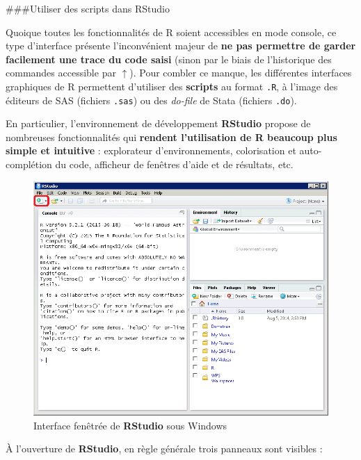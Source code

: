 \documentclass[12pt,twosided, notitlepage]{book}
\begin{document}
\#\#\#Utiliser des scripts dans RStudio

Quoique toutes les fonctionnalités de R soient accessibles en mode
console, ce type d'interface présente l'inconvénient majeur de
\textbf{ne pas permettre de garder facilement une trace du code saisi}
(sinon par le biais de l'historique des commandes accessible par
\(\uparrow\)). Pour combler ce manque, les différentes interfaces
graphiques de R permettent d'utiliser des \textbf{scripts} au format
\texttt{.R}, à l'image des éditeurs de SAS (fichiers \texttt{.sas}) ou
des \emph{do-file} de Stata (fichiers \texttt{.do}).

En particulier, l'environnement de développement \textbf{RStudio}
propose de nombreuses fonctionnalités qui \textbf{rendent l'utilisation
de R beaucoup plus simple et intuitive} : explorateur d'environnements,
colorisation et auto-complétion du code, afficheur de fenêtres d'aide et
de résultats, etc.

\begin{figure}
\centering
\includegraphics{../figures/Interface_RStudio_1.png}
\caption{Interface fenêtrée de \textbf{RStudio} sous Windows}
\end{figure}

À l'ouverture de \textbf{RStudio}, en règle générale trois panneaux sont
visibles :
\end{document}
